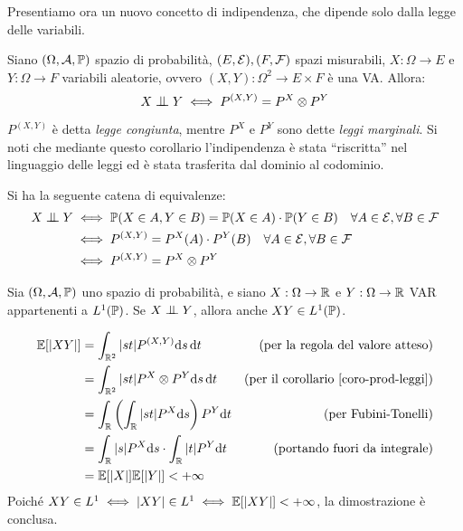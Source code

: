 \medskip
Presentiamo ora un nuovo concetto di indipendenza, che dipende solo dalla legge delle variabili.
\begin{coro}\label{coro-prod-leggi}
  Siano $(\Omega, \mathcal A, \mathbb P)$ spazio di probabilità, $(E, \mathcal E), (F,\mathcal F)$ spazi misurabili,
  $X: \Omega \to E$  e $Y: \Omega \to F$ variabili aleatorie,
  ovvero $(X,Y): \Omega^2 \to E \times F$ è una VA. Allora:
  $$X \indep Y \iff P^{(X,Y)} = P^X \otimes P^Y$$
\end{coro}
$P^{(X,Y)}$ è detta \textit{legge congiunta}, mentre $P^X $ e $P^Y$ sono dette \textit{leggi marginali}.
Si noti che mediante questo corollario l'indipendenza è stata ``riscritta'' nel linguaggio delle leggi ed è stata trasferita dal dominio al codominio.
\medskip
\begin{dimo}\belowdisplayskip=-13pt
	Si ha la seguente catena di equivalenze:
  \begin{align*}
    X \indep Y &\iff \PP(X \in A, Y \in B) = \PP(X \in A) \cdot \PP(Y \in B) \quad \forall A \in \Ec, \forall B \in \Fc\\
    &\iff P^{(X,Y)} = P^X(A) \cdot P^Y(B) \quad \forall A \in \Ec ,  \forall B \in \Fc\\
    &\iff P^{(X,Y)} = P^X \otimes P^Y
  \end{align*}\qedhere
\end{dimo}

\begin{coro}
	Sia $(\Omega,\mathcal A,\mathbb P)$ uno spazio di probabilità, e siano $X:\Omega \rightarrow \mathbb R$ e $Y:\Omega \rightarrow \mathbb R$ VAR appartenenti a $L^1(\mathbb P)$. Se $X \indep Y$, allora anche $XY \in L^1(\mathbb P)$.
\end{coro}
\begin{dimo}\Fixvmode
	\begin{align*}
		\mathbb E[|XY|] &= \int_{\mathbb R^2}|st|P^{(X,Y)} \mathrm d s \, \mathrm d t &\text{(per la regola del valore atteso)} \\
		&= \int_{\mathbb R^2} |st| P^X\otimes P^Y \mathrm d s \, \mathrm d t &\text{(per il corollario \ref{coro-prod-leggi})} \\
		&= \int_{\mathbb R} \left( \int_{\mathbb R} |st| P^X \mathrm d s \right) P^Y \mathrm d t &\text{(per Fubini-Tonelli)} \\
		&= \int_{\mathbb R}|s| P^X \mathrm d s \cdot \int_{\mathbb R}|t|P^Y \mathrm d t &\text{(portando fuori da integrale)}\\
		&= \mathbb E[|X|] \mathbb E[|Y|] < +\infty
	\end{align*}
	Poiché $XY \in L^1 \iff |XY| \in L^1 \iff \mathbb E[|XY|] < +\infty$, la dimostrazione è conclusa.
\end{dimo}
